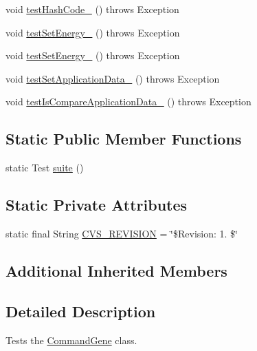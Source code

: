 \begin{DoxyCompactItemize}
\item 
void \hyperlink{classorg_1_1jgap_1_1gp_1_1_command_gene_test_add62e5f08939c843d64f5649215c226a}{test\-Hash\-Code\-\_} ()  throws Exception 
\item 
void \hyperlink{classorg_1_1jgap_1_1gp_1_1_command_gene_test_a1cd8a816588e2945ab7512cc20847d52}{test\-Set\-Energy\-\_} ()  throws Exception 
\item 
void \hyperlink{classorg_1_1jgap_1_1gp_1_1_command_gene_test_ab2f60328760e500ac79ca6454eeb076a}{test\-Set\-Energy\-\_} ()  throws Exception 
\item 
void \hyperlink{classorg_1_1jgap_1_1gp_1_1_command_gene_test_aec0b7cbce381bb794310a6dd2bd5006a}{test\-Set\-Application\-Data\-\_} ()  throws Exception 
\item 
void \hyperlink{classorg_1_1jgap_1_1gp_1_1_command_gene_test_a7464717c509df2beb429de0629ae23df}{test\-Is\-Compare\-Application\-Data\-\_} ()  throws Exception 
\end{DoxyCompactItemize}
\subsection*{Static Public Member Functions}
\begin{DoxyCompactItemize}
\item 
static Test \hyperlink{classorg_1_1jgap_1_1gp_1_1_command_gene_test_acc77013c13648d2ba98f9cb03b33034b}{suite} ()
\end{DoxyCompactItemize}
\subsection*{Static Private Attributes}
\begin{DoxyCompactItemize}
\item 
static final String \hyperlink{classorg_1_1jgap_1_1gp_1_1_command_gene_test_ad59edb3f84c045b44ab1fe19e71100ba}{C\-V\-S\-\_\-\-R\-E\-V\-I\-S\-I\-O\-N} = \char`\"{}\$Revision\-: 1. \$\char`\"{}
\end{DoxyCompactItemize}
\subsection*{Additional Inherited Members}


\subsection{Detailed Description}
Tests the \hyperlink{classorg_1_1jgap_1_1gp_1_1_command_gene}{Command\-Gene} class.

